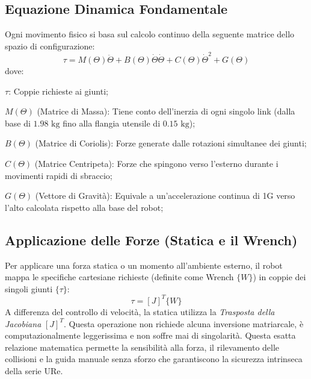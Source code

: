 %
\subsection{Equazione Dinamica Fondamentale}
\begin{theorem}
    Ogni movimento fisico si basa sul calcolo continuo della seguente matrice dello spazio di configurazione:
    \[
        \tau = M(\Theta)\ddot{\Theta} + B(\Theta)\dot{\Theta}\dot{\Theta} + C(\Theta)\dot{\Theta}^2 + G(\Theta)
    \]
    dove:
    \begin{description}
        \item $ \tau $: Coppie richieste ai giunti;
        \item $M(\Theta)$ (Matrice di Massa): Tiene conto dell'inerzia di ogni singolo link (dalla base di $1.98\text{ kg}$ fino alla flangia utensile di $0.15\text{ kg}$);
        \item $B(\Theta)$ (Matrice di Coriolis): Forze generate dalle rotazioni simultanee dei giunti;
        \item $C(\Theta)$ (Matrice Centripeta): Forze che spingono verso l'esterno durante i movimenti rapidi di sbraccio;
        \item $G(\Theta)$ (Vettore di Gravità): Equivale a un'accelerazione continua di 1G verso l'alto calcolata rispetto alla base del robot;
    \end{description}
\end{theorem}
%
\subsection{Applicazione delle Forze (Statica e il Wrench)}
Per applicare una forza statica o un momento all'ambiente esterno, il robot mappa le specifiche cartesiane richieste (definite come Wrench $\{W\}$) in coppie dei singoli giunti $\{\tau\}$:
\[
    \tau = [J]^T \{W\}
\]
A differenza del controllo di velocità, la statica utilizza la \emph{Trasposta della Jacobiana} $[J]^T$. Questa operazione non richiede alcuna inversione matriarcale, è computazionalmente leggerissima e non soffre mai di singolarità. Questa esatta relazione matematica permette la sensibilità alla forza, il rilevamento delle collisioni e la guida manuale senza sforzo che garantiscono la sicurezza intrinseca della serie URe.
